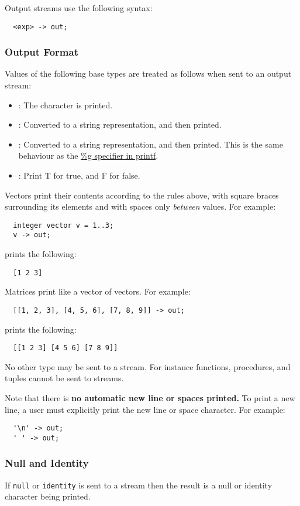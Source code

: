 \documentclass[streams.tex]{subfiles}
\begin{document}
Output streams use the following syntax:
\begin{lstlisting}
  <exp> -> out;
\end{lstlisting}

\subsubsection{Output Format}
\label{sssec:output_format}
Values of the following base types are treated as follows when sent to an output stream:
\begin{itemize}
  \item
    : The character is printed.
  \item
    : Converted to a string representation, and then printed.
  \item
    : Converted to a string representation, and then printed. This is the same behaviour
    as the \href{http://www.cplusplus.com/reference/cstdio/printf/}{\%g specifier in printf}.
  \item
    : Print T for true, and F for false.
\end{itemize}

Vectors print their contents according to the rules above, with square braces surrounding its elements
and with spaces only \textit{between} values.
For example:
\begin{lstlisting}
  integer vector v = 1..3;
  v -> out;
\end{lstlisting}

prints the following:
\begin{lstlisting}
  [1 2 3]
\end{lstlisting}

Matrices print like a vector of vectors.
For example:
\begin{lstlisting}
  [[1, 2, 3], [4, 5, 6], [7, 8, 9]] -> out;
\end{lstlisting}

prints the following:
\begin{lstlisting}
  [[1 2 3] [4 5 6] [7 8 9]]
\end{lstlisting}

No other type may be sent to a stream. For instance functions, procedures, and tuples cannot be sent
to streams.

Note that there is \textbf{no automatic new line or spaces printed.} To print a new line, a user
must explicitly print the new line or space character. For example:
\begin{lstlisting}
  '\n' -> out;
  ' ' -> out;
\end{lstlisting}

\subsubsection{Null and Identity}
\label{sssec:stream_nai}
If \texttt{null} or \texttt{identity} is sent to a stream then the result is a null or identity
character being printed.
\end{document}
